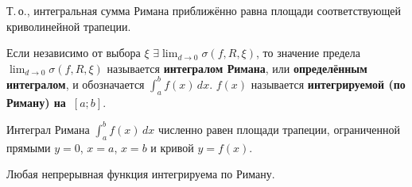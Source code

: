 Т.\,о., интегральная сумма Римана приближённо равна площади соответствующей криволинейной трапеции.

  Если независимо от выбора $\xi$ $\displaystyle \exists \lim_{d \to 0} \sigma(f, R, \xi)$, то значение предела~$\displaystyle \lim_{d \to 0} \sigma(f, R, \xi)$ называется \textbf{интегралом Римана}, или \textbf{определённым интегралом}, и обозначается $\displaystyle \int_a^b f(x)\,dx$.
$f(x)$ называется \textbf{интегрируемой (по Риману) на~$[a; b]$}.

Интеграл Римана $\displaystyle \int_a^b f(x)\,dx$ численно равен площади трапеции, ограниченной прямыми $y = 0$, $x = a$, $x = b$ и кривой $y = f(x)$.

\begin{theorem}
Любая непрерывная функция интегрируема по Риману.
\end{theorem}


